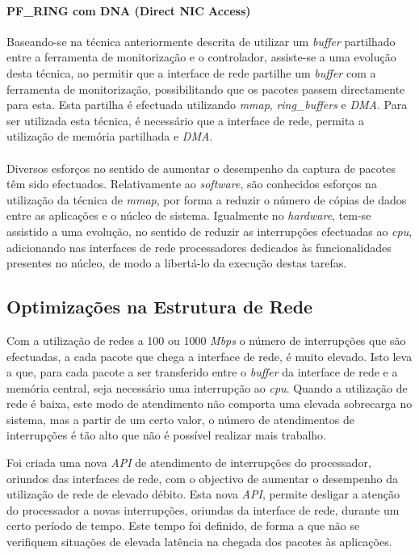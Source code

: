 \paragraph*{PF\_RING com DNA (Direct NIC Access)}
Baseando-se na técnica anteriormente descrita de utilizar um \textit{buffer} partilhado entre a ferramenta de monitorização e o controlador, assiste-se a uma evolução desta técnica, ao permitir que a interface de rede partilhe um \textit{buffer} com a ferramenta de monitorização, possibilitando que os pacotes passem directamente para esta\cite{IntroPF_RIDNADirecNICAcces}.
Esta partilha é efectuada utilizando \textit{mmap}, \textit{ring\_buffers} e \textit{DMA}.
Para ser utilizada esta técnica, é necessário que a interface de rede, permita a utilização de memória partilhada e \textit{DMA}.

\paragraph*{}

Diversos esforços no sentido de aumentar o desempenho da captura de pacotes têm sido efectuados.
Relativamente ao \textit{software}, são conhecidos esforços na utilização da técnica de \textit{mmap}, por forma a reduzir o número de cópias de dados entre as aplicações e o núcleo de sistema.
Igualmente no \textit{hardware}, tem-se assistido a uma evolução, no sentido de reduzir as interrupções efectuadas ao \textit{cpu}, adicionando nas interfaces de rede processadores dedicados às funcionalidades presentes no núcleo, de modo a libertá-lo da execução destas tarefas.


\subsection{Optimizações na Estrutura de Rede}

Com a utilização de redes a 100 ou 1000 \textit{Mbps} o número de interrupções que são efectuadas, a cada pacote que chega a interface de rede, é muito elevado.
Isto leva a que, para cada pacote a ser transferido entre o \textit{buffer} da interface de rede e a memória central, seja necessário uma interrupção ao \textit{cpu}.
Quando a utilização de rede é baixa, este modo de atendimento não comporta uma elevada sobrecarga no sistema, mas a partir de um certo valor, o número de atendimentos de interrupções é tão alto que não é possível realizar mais trabalho.

Foi criada uma nova \textit{API} de atendimento de interrupções do processador, oriundos das interfaces de rede, com o objectivo de aumentar o desempenho da utilização de rede de elevado débito.
Esta nova \textit{API}, permite desligar a atenção do processador a novas interrupções, oriundas da interface de rede, durante um certo período de tempo.
Este tempo foi definido, de forma a que não se verifiquem situações de elevada latência na chegada dos pacotes às aplicações.

